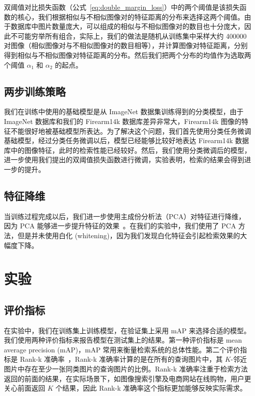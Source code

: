双阈值对比损失函数（公式~\ref{eq:double_margin_loss}）中的两个阈值是该损失函数的核心，我们根据相似与不相似图像对的特征距离的分布来选择这两个阈值。由于数据库中图片数量庞大，可以组成的相似与不相似图像对的数目也十分庞大，因此不可能穷举所有组合，实际上，我们的做法是随机从训练集中采样大约 400000 对图像（相似图像对与不相似图像对的数目相等），并计算图像对特征距离，分别得到相似与不相似图像对特征距离的分布。然后我们把两个分布的均值作为选取两个阈值 $\alpha_1$ 和 $\alpha_2$ 的起点。

\subsection{两步训练策略}

我们在训练中使用的基础模型是从 ImageNet 数据集训练得到的分类模型，由于 ImageNet 数据库和我们的 Firearm14k 数据库差异非常大，Firearm14k 图像的特征不能很好地被基础模型所表达。为了解决这个问题，我们首先使用分类任务微调基础模型，经过分类任务微调以后，模型已经能够比较好地表达 Firearm14k 数据库中的图像特征，此时的检索性能已经较好。然后，我们使用分类微调后的模型，进一步使用我们提出的双阈值损失函数进行微调，实验表明，检索的结果会得到进一步的提升。

\subsection{特征降维}

当训练过程完成以后，我们进一步使用主成份分析法（PCA）对特征进行降维，因为 PCA 能够进一步提升特征的效果~\cite{Radenovic2016CNNIR,Babenko2014NeuralCF,Tolias2015ParticularOR,Babenko2015AggregatingLD}。在我们的实验中，我们使用了 PCA 方法，但是并未使用白化 (whitening)，因为我们发现白化特征会引起检索效果的大幅度下降。

\section{实验}\label{sec:double_margin_exprt}
\subsection{评价指标}
在实验中，我们在训练集上训练模型，在验证集上采用 mAP 来选择合适的模型。我们使用两种评价指标来报告模型在测试集上的结果。第一种评价指标是 mean average precision (mAP)，mAP 常用来衡量检索系统的总体性能。第二个评价指标是 Rank-k 准确率~\cite{Jgou2011ProductQF,Song2016DeepML}，Rank-k 准确率计算的是在所有的查询图片中，其 $K$-邻近图片中存在至少一张同类图片的查询图片的比例。Rank-k 准确率注重于检索方法返回的前面的结果，在实际场景下，如图像搜索引擎及电商网站在线购物，用户更关心前面返回 $K$ 个结果，因此 Rank-k 准确率这个指标更加能够反映实际需求。

